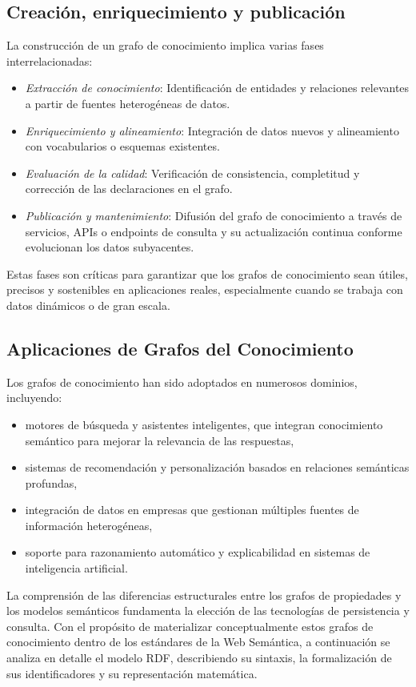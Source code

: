 \documentclass{article}
\begin{document}
\subsection{Creación, enriquecimiento y publicación}

La construcción de un grafo de conocimiento implica varias fases interrelacionadas:
\begin{itemize}
    \item \textit{Extracción de conocimiento}: Identificación de entidades y relaciones relevantes a partir de fuentes heterogéneas de datos.
    \item \textit{Enriquecimiento y alineamiento}: Integración de datos nuevos y alineamiento con vocabularios o esquemas existentes.
    \item \textit{Evaluación de la calidad}: Verificación de consistencia, completitud y corrección de las declaraciones en el grafo.
    \item \textit{Publicación y mantenimiento}: Difusión del grafo de conocimiento a través de servicios, APIs o endpoints de consulta y su actualización continua conforme evolucionan los datos subyacentes.
\end{itemize}
Estas fases son críticas para garantizar que los grafos de conocimiento sean útiles, precisos y sostenibles en aplicaciones reales, especialmente cuando se trabaja con datos dinámicos o de gran escala.

\subsection{Aplicaciones de Grafos del Conocimiento}

Los grafos de conocimiento han sido adoptados en numerosos dominios, incluyendo:
\begin{itemize}
\item motores de búsqueda y asistentes inteligentes, que integran conocimiento semántico para mejorar la relevancia de las respuestas,
\item sistemas de recomendación y personalización basados en relaciones semánticas profundas,
\item integración de datos en empresas que gestionan múltiples fuentes de información heterogéneas,
\item soporte para razonamiento automático y explicabilidad en sistemas de inteligencia artificial.
\end{itemize}


La comprensión de las diferencias estructurales entre los grafos de propiedades y los modelos semánticos fundamenta la elección de las tecnologías de persistencia y consulta. Con el propósito de materializar conceptualmente estos grafos de conocimiento dentro de los estándares de la Web Semántica, a continuación se analiza en detalle el modelo RDF, describiendo su sintaxis, la formalización de sus identificadores y su representación matemática.
\end{document}
